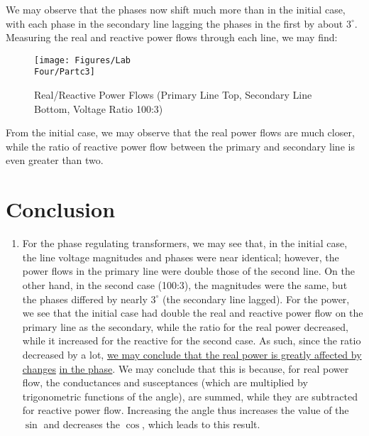 \documentclass[
	letterpaper, %
	10pt, %
]{CSUniSchoolLabReport}
\begin{document}
We may observe that the phases now shift much more than in the initial case, with each phase in the secondary line lagging the phases in the first by about $3^{\circ}$. Measuring the real and reactive power flows through each line, we may find:

\begin{figure}[H]
  \centering
  \texttt{[image: Figures/Lab\\ Four/Partc3]}
  \caption{Real/Reactive Power Flows (Primary Line Top, Secondary Line Bottom, Voltage Ratio 100:3)}
  \label{fig:7}
\end{figure}

From the initial case, we may observe that the real power flows are much closer, while the ratio of reactive power flow between the primary and secondary line is even greater than two.

\section{Conclusion}

\begin{enumerate}

  \item For the phase regulating transformers, we may see that, in the initial case, the line voltage magnitudes and phases were near identical; however, the power flows in the primary line were double those of the second line. On the other hand, in the second case (100:3), the magnitudes were the same, but the phases differed by nearly $3^{\circ}$ (the secondary line lagged). For the power, we see that the initial case had double the real and reactive power flow on the primary line as the secondary, while the ratio for the real power decreased, while it increased for the reactive for the second case. As such, since the ratio decreased by a lot, \underline{we may conclude that the real power is greatly affected by changes} \underline{in the phase}. We may conclude that this is because, for real power flow, the conductances and susceptances (which are multiplied by trigonometric functions of the angle), are summed, while they are subtracted for reactive power flow. Increasing the angle thus increases the value of the $\sin$ and decreases the $\cos$, which leads to this result.

\end{enumerate}
\end{document}

